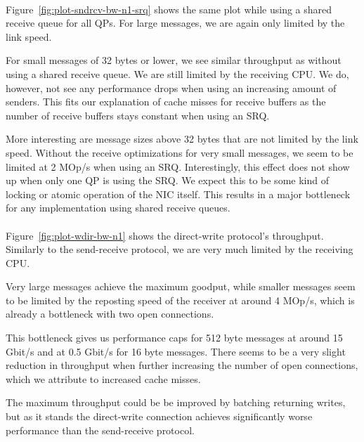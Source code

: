 \paragraph{} Figure~\ref{fig:plot-sndrcv-bw-n1-srq} shows the same plot while using a shared receive queue for all QPs. For
large messages, we are again only limited by the link speed.

For small messages of 32 bytes or lower, we see similar throughput as without using a shared receive queue. We are still
limited by the receiving CPU. We do, however, not see any performance drops when using an increasing amount of senders. This
fits our explanation of cache misses for receive buffers as the number of receive buffers stays constant when using an SRQ.


More interesting are message sizes above 32 bytes that are not limited by the link speed. Without the receive optimizations 
for very small messages, we seem to be limited at 2 MOp/s
when using an SRQ. Interestingly, this effect does not show up when only
one QP is using the SRQ. We expect this to be some kind of locking or atomic operation of the NIC itself. This results in a
major bottleneck for any implementation using shared receive queues.

\paragraph{} Figure~\ref{fig:plot-wdir-bw-n1} shows the direct-write protocol's throughput. Similarly to the 
send-receive protocol, we are very much limited by the receiving CPU.

Very large messages achieve the maximum goodput,  while smaller messages seem to be limited by the reposting speed of the 
receiver at around 4 MOp/s, which is already a bottleneck with two open connections.

This bottleneck gives us performance caps for 512 byte messages at around 15 Gbit/s and at 0.5 Gbit/s for 16 byte messages.
There seems to be a very slight reduction in throughput when further increasing the number of open connections, which we 
attribute to increased cache misses.

The maximum throughput could be be improved by batching returning writes, but as it stands the direct-write connection
achieves significantly worse performance than the send-receive protocol.



